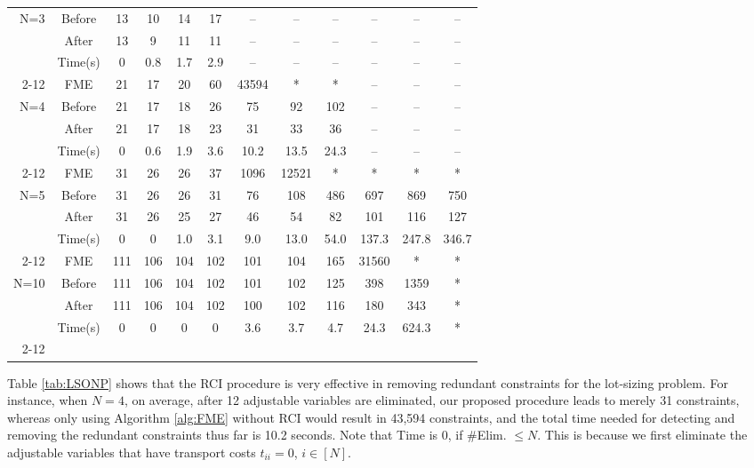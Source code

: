 \documentclass[fleqn,orsc,blindrev]{informs4}
\begin{document}
\begin{example}
\begin{table*}[t]
\begin{tabular}{rc|cccccccccc}
\multirow{2}{*}{N=3}	   & Before & 13    & 10    & 14    & 17   & --     & --      &  --      &  --      &  --      &  --  \\
& After & 13    & 9     & 11    & 11   & --     & --      &  --      &  --      &  --      &  --  \\
& Time(s)  & 0   & 0.8   & 1.7   & 2.9  & --     & --      &  --      &  --      &  --      &  --  \\ \cline{2-12}
& FME   & 21    & 17    & 20    & 60    & 43594 & *   & *  & --      &  --      &  --  \\ 
\multirow{2}{*}{N=4} & Before & 21    & 17    & 18    & 26    & 75    & 92    & 102   & --      &  --      &  -- \\ 
					& After & 21    & 17    & 18    & 23    & 31    & 33    & 36    & --      &  --      &  --  \\
					&  Time(s) & 0     & 0.6    & 1.9   &   3.6   & 10.2   & 13.5  & 24.3  & --     & --     & -- \\ \cline{2-12}
					& FME   & 31    & 26    & 26    & 37    & 1096  & 12521 & *   & *   & *   & * \\ 
					\multirow{2}{*}{N=5} & Before & 31    & 26    & 26    & 31    & 76    &    108   & 486   & 697   & 869   & 750 \\ 
					& After & 31    & 26    & 25    & 27    & 46    &    54   & 82    & 101   & 116   & 127 \\
					& Time(s) & 0     & 0     & 1.0   & 3.1     & 9.0   & 13.0  & 54.0  & 137.3 & 247.8 & 346.7 \\	\cline{2-12}
					& FME   & 111   & 106   & 104   & 102   & 101   & 104   & 165   & 31560 & *   & * \\  
					\multirow{2}{*}{N=10}  & Before & 111   & 106   & 104   & 102   & 101   & 102   & 125   & 398   & 1359  & * \\
					& After & 111   & 106   & 104   & 102   & 100   & 102   & 116   & 180   & 343   & * \\
					&  Time(s)  & 0     & 0  & 0  & 0  & 3.6   & 3.7   & 4.7   & 24.3  & 624.3 & * \\ 	 \cline{2-12}
				\end{tabular}%
				\label{tab:LSONP}
			\end{table*}%
			Table \ref{tab:LSONP} shows that the RCI procedure is very effective in removing redundant constraints for the lot-sizing problem. For instance, when $N=4$, on average, after 12 adjustable variables are eliminated, our proposed procedure leads to merely 31 constraints, whereas only using Algorithm \ref{alg:FME} without RCI would result in 43,594 constraints, and the total time needed for detecting and removing the redundant constraints thus far is 10.2 seconds. Note that Time is 0, if \#Elim. $\le N$. This is because we first eliminate the adjustable variables that have transport costs $t_{ii}=0$, $i\in [N]$.
			 
			 \hfill \Halmos 
		\end{example}
		
\end{document}
